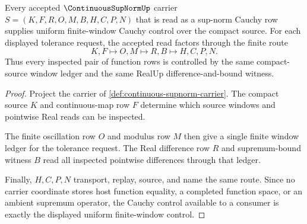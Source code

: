 \begin{theorem}
\label{thm:continuous-supnorm-cauchy-control}
Every accepted $\ContinuousSupNormUp$ carrier $S=(K,F,R,O,M,B,H,C,P,N)$ that is read as a sup-norm Cauchy row supplies uniform finite-window Cauchy control over the compact source. For each displayed tolerance request, the accepted read factors through the finite route
$$
K,F \longmapsto O,M \longmapsto R,B \longmapsto H,C,P,N .
$$
Thus every inspected pair of function rows is controlled by the same compact-source window ledger and the same RealUp difference-and-bound witness.
\end{theorem}
\begin{proof}
Project the carrier of \autoref{def:continuous-supnorm-carrier}. The compact source $K$ and continuous-map row $F$ determine which source windows and pointwise Real reads can be inspected.

The finite oscillation row $O$ and modulus row $M$ then give a single finite window ledger for the tolerance request. The Real difference row $R$ and supremum-bound witness $B$ read all inspected pointwise differences through that ledger.

Finally, $H,C,P,N$ transport, replay, source, and name the same route. Since no carrier coordinate stores host function equality, a completed function space, or an ambient supremum operator, the Cauchy control available to a consumer is exactly the displayed uniform finite-window control.
\end{proof}

